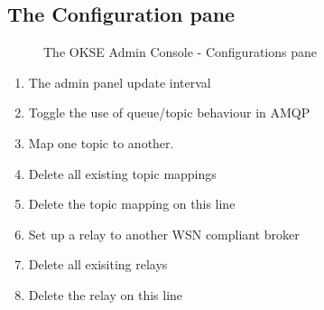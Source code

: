 \subsection{The Configuration pane}
\begin{center}
  \begin{figure}[ht!]
    \caption{The OKSE Admin Console - Configurations pane} 
    \label{fig:OKSE Admin Console - Configurations pane}
  \end{figure}
\end{center}
\begin{enumerate}
\item The admin panel update interval
\item Toggle the use of queue/topic behaviour in AMQP
\item Map one topic to another.
\item Delete all existing topic mappings
\item Delete the topic mapping on this line
\item Set up a relay to another WSN compliant broker
\item Delete all exisiting relays
\item Delete the relay on this line
\end{enumerate}


